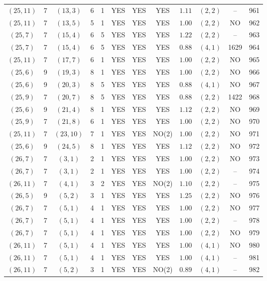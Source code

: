 \begin{longtable}{|c|c|c|c|c|c|c|c|c|c|c|c|}
$(25,11)$ & 7 & $(13,3)$ & 6 & 1 & YES & YES & YES & $1.11$ & $(2,2)$ & -- & 961\\
$(25,11)$ & 7 & $(13,5)$ & 5 & 1 & YES & YES & YES & $1.00$ & $(2,2)$ & NO & 962\\
$(25,7)$ & 7 & $(15,4)$ & 6 & 5 & YES & YES & YES & $1.22$ & $(2,2)$ & -- & 963\\
$(25,7)$ & 7 & $(15,4)$ & 6 & 5 & YES & YES & YES & $0.88$ & $(4,1)$ & 1629 & 964\\
$(25,11)$ & 7 & $(17,7)$ & 6 & 1 & YES & YES & YES & $1.00$ & $(2,2)$ & NO & 965\\
$(25,6)$ & 9 & $(19,3)$ & 8 & 1 & YES & YES & YES & $1.00$ & $(2,2)$ & NO & 966\\
$(25,6)$ & 9 & $(20,3)$ & 8 & 5 & YES & YES & YES & $0.88$ & $(4,1)$ & NO & 967\\
$(25,9)$ & 7 & $(20,7)$ & 8 & 5 & YES & YES & YES & $0.88$ & $(2,2)$ & 1422 & 968\\
$(25,6)$ & 9 & $(21,4)$ & 8 & 1 & YES & YES & YES & $1.12$ & $(2,2)$ & NO & 969\\
$(25,9)$ & 7 & $(21,8)$ & 6 & 1 & YES & YES & YES & $1.00$ & $(2,2)$ & NO & 970\\
$(25,11)$ & 7 & $(23,10)$ & 7 & 1 & YES & YES & NO(2) & $1.00$ & $(2,2)$ & NO & 971\\
$(25,6)$ & 9 & $(24,5)$ & 8 & 1 & YES & YES & YES & $1.12$ & $(2,2)$ & NO & 972\\
$(26,7)$ & 7 & $(3,1)$ & 2 & 1 & YES & YES & YES & $1.00$ & $(2,2)$ & NO & 973\\
$(26,7)$ & 7 & $(3,1)$ & 2 & 1 & YES & YES & YES & $1.00$ & $(2,2)$ & -- & 974\\
$(26,11)$ & 7 & $(4,1)$ & 3 & 2 & YES & YES & NO(2) & $1.10$ & $(2,2)$ & -- & 975\\
$(26,5)$ & 9 & $(5,2)$ & 3 & 1 & YES & YES & YES & $1.25$ & $(2,2)$ & NO & 976\\
$(26,7)$ & 7 & $(5,1)$ & 4 & 1 & YES & YES & YES & $1.00$ & $(2,2)$ & NO & 977\\
$(26,7)$ & 7 & $(5,1)$ & 4 & 1 & YES & YES & YES & $1.00$ & $(2,2)$ & -- & 978\\
$(26,7)$ & 7 & $(5,1)$ & 4 & 1 & YES & YES & YES & $1.00$ & $(2,2)$ & NO & 979\\
$(26,11)$ & 7 & $(5,1)$ & 4 & 1 & YES & YES & YES & $1.00$ & $(4,1)$ & NO & 980\\
$(26,11)$ & 7 & $(5,1)$ & 4 & 1 & YES & YES & YES & $1.00$ & $(4,1)$ & -- & 981\\
$(26,11)$ & 7 & $(5,2)$ & 3 & 1 & YES & YES & NO(2) & $0.89$ & $(4,1)$ & -- & 982\\

\end{longtable}
